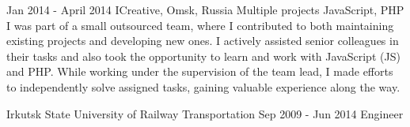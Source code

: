 \documentclass[11pt,a4paper,sans]{awesomecv}
\begin{document}
\begin{cventries}
    {Jan 2014 - April 2014}
    {ICreative, Omsk, Russia}{}
    {
      Multiple projects\newline
      \vspace{0.8ex}
      \cvproject
          {}{}{}
          {JavaScript, PHP}
          {
            I was part of a small outsourced team, 
            where I contributed to both maintaining 
            existing projects and developing new ones. 
            I actively assisted senior colleagues in their tasks 
            and also took the opportunity to learn and work with 
            JavaScript (JS) and PHP. While working under the supervision 
            of the team lead, I made efforts to independently solve 
            assigned tasks, gaining valuable experience along the way.
          }
    }
\end{cventries}

\begin{cventries}
\cventry
    {Irkutsk State University of Railway Transportation}
    {Sep 2009 - Jun 2014}
    {Engineer}
    {}
    {}
\end{cventries}
\end{document}
